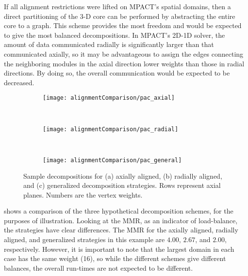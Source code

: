 {{    If all alignment restrictions were lifted on MPACT's spatial domains, then a direct partitioning of the 3-D core can be performed by abstracting the entire core to a graph.
    This scheme provides the most freedom and would be expected to give the most balanced decompositions.
    In MPACT's 2D-1D solver, the amount of data communicated radially is significantly larger than that communicated axially, so it may be advantageous to assign the edges connecting the neighboring modules in the axial direction lower weights than those in radial directions.
    By doing so, the overall communication would be expected to be decreased.

    \begin{figure}
      \centering
      \begin{subfigure}[t]{0.3\textwidth}
        \centering
        \texttt{[image: alignmentComparison/pac\_axial]}
        \caption{}
      \end{subfigure}%
      ~
      \begin{subfigure}[t]{0.3\textwidth}
        \centering
        \texttt{[image: alignmentComparison/pac\_radial]}
        \caption{}
      \end{subfigure}%
      ~
      \begin{subfigure}[t]{0.3\textwidth}
        \centering
        \texttt{[image: alignmentComparison/pac\_general]}
        \caption{}
      \end{subfigure}
      \caption{
        Sample decompositions for (a) axially aligned, (b) radially aligned, and (c) generalized decomposition strategies.
        Rows represent axial planes.
        Numbers are the vertex weights.
        \label{fig:Spatial Decomposition:partitionAlignmentComparison}
      }
    \end{figure}

     shows a comparison of the three hypothetical decomposition schemes, for the purposes of illustration.
    Looking at the \ac{MMR}, as an indicator of load-balance, the strategies have clear differences.
    The \ac{MMR} for the axially aligned, radially aligned, and generalized strategies in this example are $4.00$, $2.67$, and $2.00$, respectively.
    However, it is important to note that the largest domain in each case has the same weight (16), so while the different schemes give different balances, the overall run-times are not expected to be different.
  }
}
